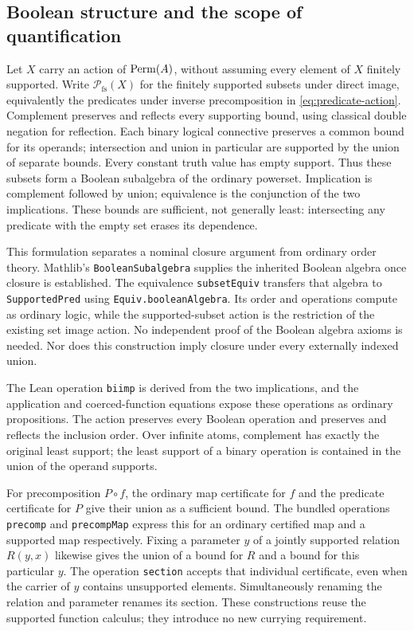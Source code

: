 \subsection{Boolean structure and the scope of quantification}

Let $X$ carry an action of $\operatorname{Perm}(A)$, without assuming every element of
$X$ finitely supported. Write $\mathcal P_{\mathrm{fs}}(X)$ for the
finitely supported subsets under direct image, equivalently the predicates
under inverse precomposition in \eqref{eq:predicate-action}.
Complement preserves and reflects every supporting bound, using classical
double negation for reflection. Each binary logical connective preserves a
common bound for its operands; intersection and union in particular are
supported by the union of separate bounds. Every constant truth value has
empty support. Thus these subsets form a Boolean subalgebra of the ordinary
powerset. Implication is complement followed by union; equivalence is the
conjunction of the two implications. These bounds are sufficient, not generally
least: intersecting any predicate with the empty set erases its dependence.

This formulation separates a nominal closure argument from ordinary order
theory. Mathlib's \texttt{BooleanSubalgebra} supplies the inherited Boolean
algebra once closure is established. The equivalence \texttt{subsetEquiv}
transfers that algebra to \texttt{SupportedPred} using
\texttt{Equiv.booleanAlgebra}. Its order and operations compute as ordinary
logic, while the supported-subset action is the restriction of the existing
set image action. No independent proof of the Boolean algebra axioms is needed.
Nor does this construction imply
closure under every externally indexed union.

The Lean operation \texttt{biimp} is derived from the two implications, and
the application and coerced-function equations expose these operations as
ordinary propositions. The action preserves every Boolean operation and
preserves and reflects the inclusion order. Over infinite atoms, complement
has exactly the original least support; the least support of a binary
operation is contained in the union of the operand supports.

For precomposition $P\circ f$, the ordinary map certificate for $f$ and the
predicate certificate for $P$ give their union as a sufficient bound.
The bundled operations \texttt{precomp} and \texttt{precompMap} express this
for an ordinary certified map and a supported map respectively. Fixing a
parameter $y$ of a jointly supported relation $R(y,x)$ likewise gives the
union of a bound for $R$ and a bound for this particular $y$. The operation
\texttt{section} accepts that individual certificate, even when the carrier
of $y$ contains unsupported elements. Simultaneously renaming the relation
and parameter renames its section. These constructions reuse the supported
function calculus; they introduce no new currying requirement.

